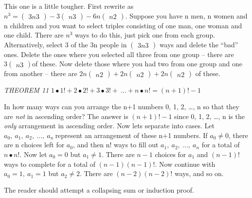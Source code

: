 \documentclass[10pt,letter]{article}
\begin{document}
This one is a little tougher. First rewrite as \(n^{3} =
\begin{pmatrix}
3n
3
\end{pmatrix}
 - 3
\begin{pmatrix}
n
3
\end{pmatrix}
 - 6n
\begin{pmatrix}
n
2
\end{pmatrix}
\). Suppose you have n men, n women and n children and you
want to select triples consisting of one man, one woman and one child.
There are \(n^{3}\) ways to do this, just pick one from each group.
Alternatively, select 3 of the 3n people in \(\begin{pmatrix}
3n
3
\end{pmatrix}
\) ways and delete the ``bad'' ones. Delete the ones where
you selected all three from one group -- there are \(3
\begin{pmatrix}
n
3
\end{pmatrix}
\)of these. Now delete those where you had two from one
group and one from another -- there are \(2n
\begin{pmatrix}
n
2
\end{pmatrix}
 + 2n
\begin{pmatrix}
n
2
\end{pmatrix}
 + 2n
\begin{pmatrix}
n
2
\end{pmatrix}
\) of these.

\emph{THEOREM 11}
\(1 \bullet 1! + 2 \bullet 2! + 3 \bullet 3! + \ \ldots + n \bullet n! = \left( n + 1 \right)! - 1\)

In how many ways can you arrange the n+1 numbers 0, 1, 2, \ldots{}, n so
that they are \emph{not} in ascending order? The answer is
\(\left( n + 1 \right)! - 1\) since 0, 1, 2, \ldots{}, n is the
\emph{only} arrangement in ascending order. Now lets separate into
cases. Let \(a_{0},\ a_{1},\ a_{2},\ \ldots,\ a_{n}\ \)represent an
arrangement of these n+1 numbers. If \(a_{0} \neq 0\), there are n
choices left for \(a_{0}\), and then n! ways to fill out
\(a_{1},\ a_{2},\ \ldots,\ a_{n}\) for a total of \(n \bullet n!\). Now
let \(a_{0} = 0\) but \(a_{1} \neq 1\). There are \(n - 1\) choices for
\(a_{1}\) and \(\left( n - 1 \right)!\ \)ways to complete for a total of
\(\left( n - 1 \right)\left( n - 1 \right)!\). Now continue with
\(a_{0} = 1,\ a_{1} = 1\) but \(a_{2} \neq 2\). There are
\(\left( n - 2 \right)\left( n - 2 \right)!\) ways, and so on.

The reader should attempt a collapsing sum or induction proof.
\end{document}
